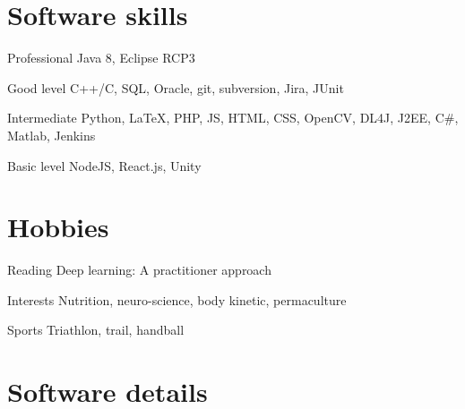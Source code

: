 \documentclass{tccv-master/tccv}
\begin{document}
\section{Software skills}

\begin{factlist}

\item{Professional}
	{Java 8, Eclipse RCP3}
\item{Good level}
     {C++/C, SQL, Oracle, git, subversion, Jira, JUnit}

\item{Intermediate}
     {Python, \LaTeX, PHP, JS, HTML, CSS, OpenCV, DL4J, J2EE, C\#, Matlab, Jenkins}

\item{Basic level}
     {NodeJS, React.js, Unity}

\end{factlist}

\section{Hobbies}

\begin{factlist}

\item{Reading}
	{Deep learning: A practitioner approach}
\item{Interests}
	{Nutrition, neuro-science, body kinetic, permaculture}
\item{Sports}
	{Triathlon, trail, handball}
\end{factlist}
\newpage




\section{Software details}
\end{document}
